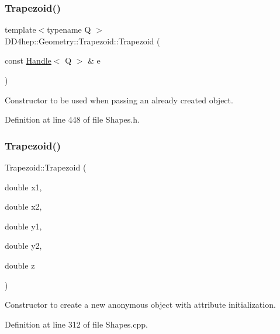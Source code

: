 \subsubsection{\texorpdfstring{Trapezoid()}{Trapezoid()}\hspace{0.1cm}{\footnotesize\ttfamily [4/6]}}
{\footnotesize\ttfamily template$<$typename Q $>$ \\
D\+D4hep\+::\+Geometry\+::\+Trapezoid\+::\+Trapezoid (\begin{DoxyParamCaption}\item[{const \hyperlink{class_d_d4hep_1_1_handle}{Handle}$<$ Q $>$ \&}]{e }\end{DoxyParamCaption})\hspace{0.3cm}{\ttfamily [inline]}}



Constructor to be used when passing an already created object. 



Definition at line 448 of file Shapes.\+h.

\hypertarget{class_d_d4hep_1_1_geometry_1_1_trapezoid_a3c8b1150038001c51909aab4350c7228}{}\label{class_d_d4hep_1_1_geometry_1_1_trapezoid_a3c8b1150038001c51909aab4350c7228} 
\subsubsection{\texorpdfstring{Trapezoid()}{Trapezoid()}\hspace{0.1cm}{\footnotesize\ttfamily [5/6]}}
{\footnotesize\ttfamily Trapezoid\+::\+Trapezoid (\begin{DoxyParamCaption}\item[{double}]{x1,  }\item[{double}]{x2,  }\item[{double}]{y1,  }\item[{double}]{y2,  }\item[{double}]{z }\end{DoxyParamCaption})}



Constructor to create a new anonymous object with attribute initialization. 



Definition at line 312 of file Shapes.\+cpp.

\hypertarget{class_d_d4hep_1_1_geometry_1_1_trapezoid_a378085e176651d02def815671ef757f6}{}\label{class_d_d4hep_1_1_geometry_1_1_trapezoid_a378085e176651d02def815671ef757f6} 
